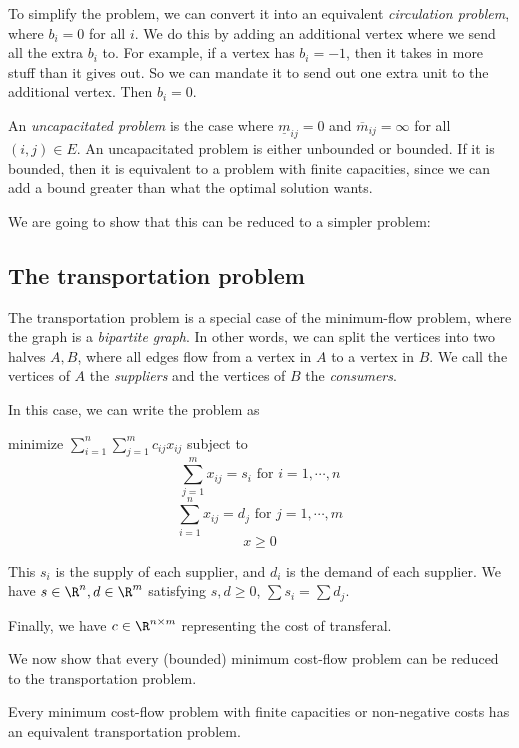 \documentclass[a4paper]{article}
\begin{document}
To simplify the problem, we can convert it into an equivalent \emph{circulation problem}, where $b_i = 0$ for all $i$. We do this by adding an additional vertex where we send all the extra $b_i$ to. For example, if a vertex has $b_i = -1$, then it takes in more stuff than it gives out. So we can mandate it to send out one extra unit to the additional vertex. Then $b_i = 0$.

An \emph{uncapacitated problem} is the case where $\underline{m}_{ij} = 0$ and $\overline{m}_{ij} = \infty$ for all $(i, j) \in E$. An uncapacitated problem is either unbounded or bounded. If it is bounded, then it is equivalent to a problem with finite capacities, since we can add a bound greater than what the optimal solution wants.

We are going to show that this can be reduced to a simpler problem:

\subsection{The transportation problem}
The transportation problem is a special case of the minimum-flow problem, where the graph is a \emph{bipartite graph}. In other words, we can split the vertices into two halves $A, B$, where all edges flow from a vertex in $A$ to a vertex in $B$. We call the vertices of $A$ the \emph{suppliers} and the vertices of $B$ the \emph{consumers}.

In this case, we can write the problem as
\begin{center}
  minimize $\displaystyle\sum_{i = 1}^n\sum_{j = 1}^m c_{ij}x_{ij}$ subject to
  \[
    \sum_{j = 1}^m x_{ij} = s_i\text{ for }i = 1, \cdots, n
  \]
  \[
    \sum_{i = 1}^n x_{ij} = d_j\text{ for }j = 1, \cdots, m
  \]
  \[
    x\geq 0
  \]
\end{center}
This $s_i$ is the supply of each supplier, and $d_i$ is the demand of each supplier. We have $s\in \R^n, d\in \R^m$ satisfying $s, d\geq 0$, $\sum s_i = \sum d_j$.

Finally, we have $c\in \R^{n\times m}$ representing the cost of transferal.

We now show that every (bounded) minimum cost-flow problem can be reduced to the transportation problem.

\begin{thm}[]
  Every minimum cost-flow problem with finite capacities or non-negative costs has an equivalent transportation problem.
\end{thm}
\end{document}
